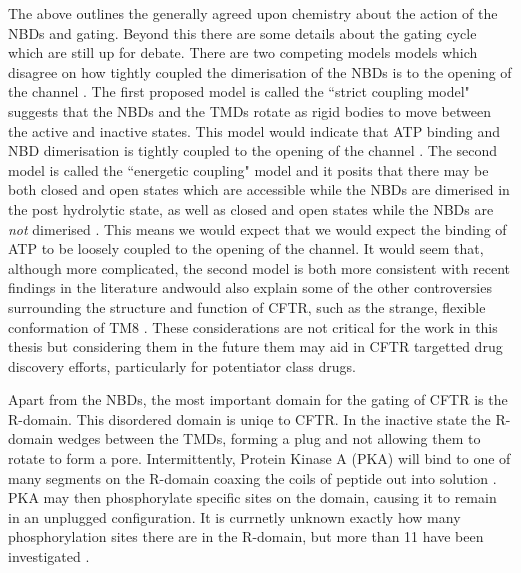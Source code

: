 The above outlines the generally agreed upon chemistry about the action of the NBDs and gating. Beyond this there are some details about the gating cycle which are still up for debate. There are two competing models models which disagree on how tightly coupled the dimerisation of the NBDs is to the opening of the channel \cite{yeh2022}. The first proposed model is called the ``strict coupling model" suggests that the NBDs and the TMDs rotate as rigid bodies to move between the active and inactive states. This model would indicate that ATP binding and NBD dimerisation is tightly coupled to the opening of the channel \cite{}. The second model is called the ``energetic coupling" model and it posits that there may be both closed and open states which are accessible while the NBDs are dimerised in the post hydrolytic state, as well as closed and open states while the NBDs are \textit{not} dimerised \cite{jih2012}. This means we would expect that we would expect the binding of ATP to be loosely coupled to the opening of the channel. It would seem that, although more complicated, the second model is both more consistent with recent findings in the literature andwould also explain some of the other controversies surrounding the structure and function of CFTR, such as the strange, flexible conformation of TM8 \cite{fay2018}. These considerations are not critical for the work in this thesis but considering them in the future them may aid in CFTR targetted drug discovery efforts, particularly for potentiator class drugs.


Apart from the NBDs, the most important domain for the gating of CFTR is the R-domain. This disordered domain is uniqe to CFTR. In the inactive state the R-domain wedges between the TMDs, forming a plug and not allowing them to rotate to form a pore. Intermittently, Protein Kinase A (PKA) will bind to one of many segments on the R-domain coaxing the coils of peptide out into solution \cite{mihalyi2020}. PKA may then phosphorylate specific sites on the domain, causing it to remain in an unplugged configuration. It is currnetly unknown exactly how many phosphorylation sites there are in the R-domain, but more than 11 have been investigated \cite{mihalyi2020}. 

